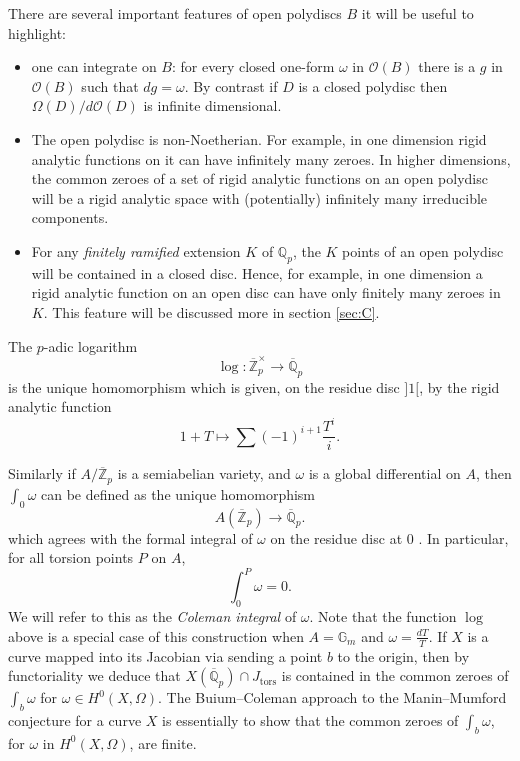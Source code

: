 \documentclass{amsart}
\def\Z{\mathbb Z}
\def\Q{\mathbb Q}
\theoremstyle{definition}
\begin{document}
There are several important features of open polydiscs $B$ it will be useful to highlight:
\begin{itemize}
\item one can integrate on $B$: for every closed one-form $\omega $ in $\mathcal{O}(B)$ there is a $g$ in $\mathcal{O}(B)$ such that $dg=\omega $. By contrast if $D$ is a closed polydisc then $\Omega (D)/d\mathcal{O}(D)$ is infinite dimensional.
\item The open polydisc is non-Noetherian. For example, in one dimension rigid analytic functions on it can have infinitely many zeroes. In higher dimensions, the common zeroes of a set of rigid analytic functions on an open polydisc will be a rigid analytic space with (potentially) infinitely many irreducible components.
\item For any \textit{finitely ramified} extension $K$ of $\Q _p $, the $K$ points of an open polydisc will be contained in a closed disc. Hence, for example, in one dimension a rigid analytic function on an open disc can have only finitely many zeroes in $K$. This feature will be discussed more in section \ref{sec:C}.
\end{itemize}

The $p$-adic logarithm
\[
\log :\overline{\Z }_p ^\times \to \overline{\Q }_p 
\]
is the unique homomorphism which is given, on the residue disc $]1[$, by the rigid analytic function
\[
1+T\mapsto \sum (-1)^{i+1}\frac{T^i}{i}.
\]

Similarly if $A/\overline{\Z }_p$ is a semiabelian variety, and $\omega $ is a global differential on $A$, then $\int _0 \omega $ can be defined as the unique homomorphism
\[
A(\overline{\Z }_p )\to \overline{\Q }_p .
\]
which agrees with the formal integral of $\omega $ on the residue disc at $0$ \cite{coleman:torsion} \cite{zarhin}. In particular, for all torsion points $P$ on $A$,
\[
\int ^P _0 \omega =0.
\]
We will refer to this as the \textit{Coleman integral} of $\omega $. Note that the function $\log $ above is a special case of this construction when $A=\mathbb{G}_m$ and $\omega =\frac{dT}{T}$. If $X$ is a curve mapped into its Jacobian via sending a point $b$ to the origin, then by functoriality we deduce that $X(\overline{\Q }_p )\cap J_{\mathrm{tors}}$ is contained in the common zeroes of $\int _b \omega $ for $\omega \in H^0 (X,\Omega )$.
The Buium--Coleman approach to the Manin--Mumford conjecture for a curve $X$ is essentially to show that the common zeroes of $\int _b \omega$,
for $\omega $ in $H^0 (X,\Omega )$, are finite.
\end{document}
